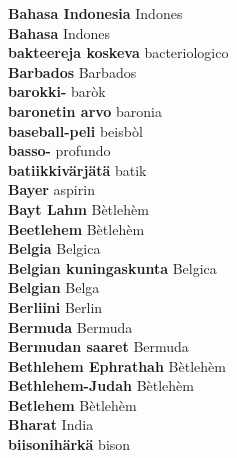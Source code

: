 \textbf{ Bahasa Indonesia  } Indones \\
\textbf{ Bahasa  } Indones \\
\textbf{ bakteereja koskeva  } bacteriologico \\
\textbf{ Barbados  } Barbados \\
\textbf{ barokki-  } baròk \\
\textbf{ baronetin arvo  } baronia \\
\textbf{ baseball-peli  } beisbòl \\
\textbf{ basso-  } profundo \\
\textbf{ batiikkivärjätä  } batik \\
\textbf{ Bayer  } aspirin \\
\textbf{ Bayt Lahm  } Bètlehèm \\
\textbf{ Beetlehem  } Bètlehèm \\
\textbf{ Belgia  } Belgica \\
\textbf{ Belgian kuningaskunta  } Belgica \\
\textbf{ Belgian  } Belga \\
\textbf{ Berliini  } Berlin \\
\textbf{ Bermuda  } Bermuda \\
\textbf{ Bermudan saaret  } Bermuda \\
\textbf{ Bethlehem Ephrathah  } Bètlehèm \\
\textbf{ Bethlehem-Judah  } Bètlehèm \\
\textbf{ Betlehem  } Bètlehèm \\
\textbf{ Bharat  } India \\
\textbf{ biisonihärkä  } bison \\
